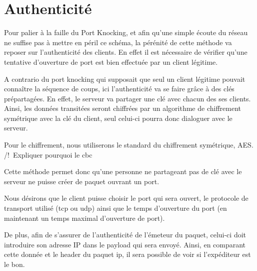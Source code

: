 \chapter{Authenticité}

Pour palier à la faille du Port Knocking, et afin qu'une simple écoute du réseau ne suffise pas à mettre en péril ce schéma, la pérénité de cette méthode va reposer sur l'authenticité des clients. En effet il est nécessaire de vérifier qu'une tentative d'ouverture de port est bien effectuée par un client légitime.

A contrario du port knocking qui supposait que seul un client légitime pouvait connaître la séquence de coups, ici l'authenticité va se faire grâce à des clés prépartagées. En effet, le serveur va partager une clé avec chacun des ses clients. Ainsi, les données transitées seront chiffrées par un algorithme de chiffrement symétrique avec la clé du client, seul celui-ci pourra donc dialoguer avec le serveur. 

Pour le chiffrement, nous utiliserons le standard du chiffrement symétrique, AES.
/!\ Expliquer pourquoi le cbc

Cette méthode permet donc qu'une personne ne partageant pas de clé avec le serveur ne puisse créer de paquet ouvrant un port.

Nous désirons que le client puisse choisir le port qui sera ouvert, le protocole de transport utilisé (tcp ou udp) ainsi que le temps d'ouverture du port (en maintenant un temps maximal d'ouverture de port).

De plus, afin de s'assurer de l'authenticité de l'émeteur du paquet, celui-ci doit introduire son adresse IP dans le payload qui sera envoyé. Ainsi, en comparant cette donnée et le header du paquet ip, il sera possible de voir si l'expéditeur est le bon.
